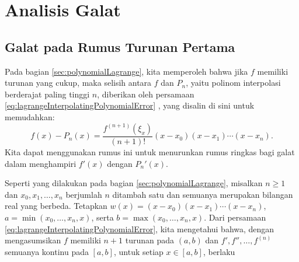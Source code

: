 
\section{\label{sec:calculusErrorAnalysis}Analisis Galat}

\subsection{Galat pada Rumus Turunan Pertama}

Pada bagian \ref{sec:polynomialLagrange}, kita memperoleh bahwa jika
$f$ memiliki turunan yang cukup, maka selisih antara $f$ dan $P_{n}$,
yaitu polinom interpolasi berderajat paling tinggi $n$, diberikan
oleh persamaan \ref{eq:lagrangeInterpolatingPolynomialError} ,
yang disalin di sini untuk memudahkan:
\[
f(x)-P_{n}(x)=\frac{f^{(n+1)}(\xi_{x})}{(n+1)!}(x-x_{0})(x-x_{1})\cdots(x-x_{n}).
\]
Kita dapat menggunakan rumus ini untuk menurunkan rumus ringkas bagi
galat dalam menghampiri $f'(x)$ dengan $P_{n}'(x)$.

Seperti yang dilakukan pada bagian \ref{sec:polynomialLagrange},
misalkan $n\geq1$ dan $x_{0},x_{1},\ldots,x_{n}$ berjumlah $n$
ditambah satu dan semuanya merupakan bilangan real yang berbeda. Tetapkan
$w(x)=(x-x_{0})(x-x_{1})\cdots(x-x_{n})$, $a=\min(x_{0},\ldots,x_{n},x)$,
serta $b=\max(x_{0},\ldots,x_{n},x)$. Dari persamaan \ref{eq:lagrangeInterpolatingPolynomialError},
kita mengetahui bahwa, dengan mengasumsikan $f$ memiliki $n+1$ turunan
pada $(a,b)$ dan $f',f'',\ldots,f^{(n)}$ semuanya kontinu pada $[a,b]$,
untuk setiap $x\in[a,b]$, berlaku

